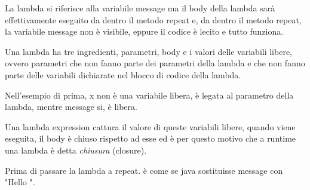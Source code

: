 La lambda si riferisce alla variabile message ma il body della lambda sarà effettivamente eseguito da dentro il metodo repeat e, da dentro il metodo repeat, la 
variabile message non è visibile, eppure il codice è lecito e tutto funziona.

Una lambda ha tre ingredienti, parametri, body e i valori delle variabili libere, ovvero parametri che non fanno parte dei parametri della lambda e che non fanno parte
delle variabili dichiarate nel blocco di codice della lambda.

Nell'esempio di prima, x non è una variabile libera, è legata al parametro della lambda, mentre message si, è libera.

Una lambda expression cattura il valore di queste variabili libere, quando viene eseguita, il body è chiuso rispetto ad esse ed è per questo motivo che a runtime una
lambda è detta \textit{chiusura} (closure).

Prima di passare la lambda a repeat. è come se java sostituisse message con "Hello ".









